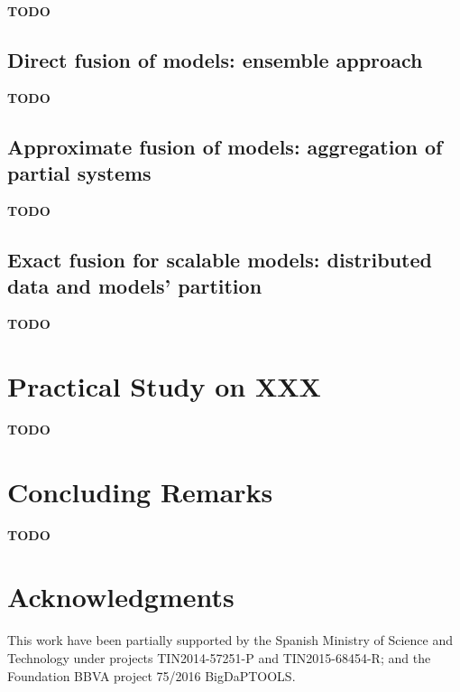 \documentclass[3p,review]{elsarticle}
\newcommand{\TODO}{\textbf{TODO}}
\begin{document}
\TODO

\subsection{Direct fusion of models: ensemble approach}\label{subsec:ensemble}

\TODO

\subsection{Approximate fusion of models: aggregation of partial systems}\label{subsec:submodels}

\TODO

\subsection{Exact fusion for scalable models: distributed data and models' partition}\label{subsec:exact}

\TODO

\section{Practical Study on XXX}\label{sec:exp}

\TODO



\section{Concluding Remarks}\label{sec:conclusions}

\TODO

\section*{Acknowledgments}\label{sec:ack}

This work have been partially supported by the Spanish Ministry of Science and Technology under projects TIN2014-57251-P and TIN2015-68454-R; and the Foundation BBVA project 75/2016 BigDaPTOOLS.




\end{document}

